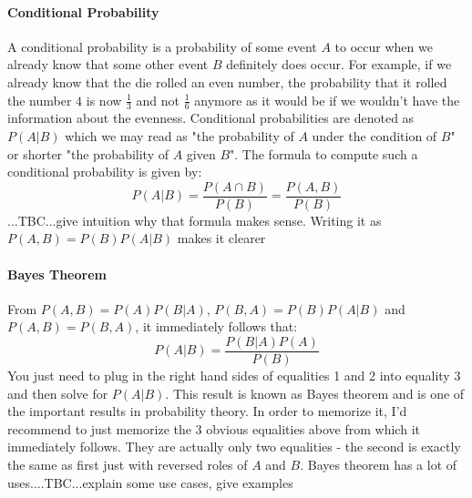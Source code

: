 \paragraph{Conditional Probability}
A conditional probability is a probability of some event $A$ to occur when we already know that some other event $B$ definitely does occur. For example, if we already know that the die rolled an even number, the probability that it rolled the number $4$ is now $\frac{1}{3}$ and not $\frac{1}{6}$ anymore as it would be if we wouldn't have the information about the evenness. Conditional probabilities are denoted as $P(A|B)$ which we may read as "the probability of $A$ under the condition of $B$" or shorter "the probability of $A$ given $B$". The formula to compute such a conditional probability is given by:
\begin{equation}
\label{Eq:ConditionalProbability}
 P(A|B) = \frac{P(A \cap B)}{P(B)} = \frac{P(A, B)}{P(B)}
\end{equation}
...TBC...give intuition why that formula makes sense. Writing it as $P(A,B) = P(B) P(A|B)$ makes it clearer








\paragraph{Bayes Theorem}
From $P(A, B) = P(A) P(B|A)$,  $P(B, A) = P(B) P(A|B)$ and $P(A, B) = P(B, A)$, it immediately follows that:
\begin{equation}
\label{Eq:BayesTheorem}
 P(A|B) = \frac{P(B|A) P(A)}{P(B)}
\end{equation}
You just need to plug in the right hand sides of equalities 1 and 2 into equality 3 and then solve for $ P(A|B)$. This result is known as Bayes theorem and is one of the important results in probability theory. In order to memorize it, I'd recommend to just memorize the 3 obvious equalities above from which it immediately follows. They are actually only two equalities - the second is exactly the same as first just with reversed roles of $A$ and $B$. Bayes theorem has a lot of uses....TBC...explain some use cases, give examples

